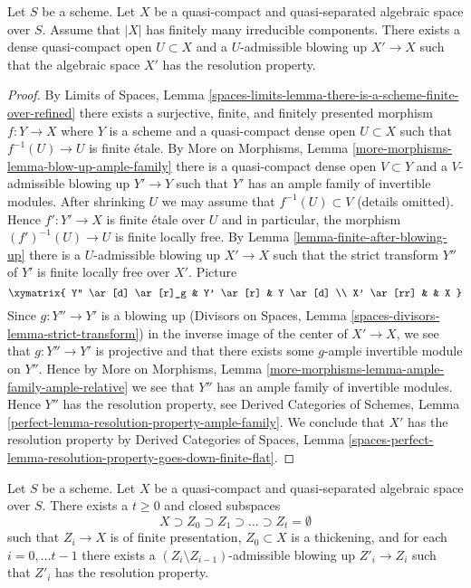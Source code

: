 \begin{lemma}
\label{lemma-blow-up-resolution-property}
Let $S$ be a scheme. Let $X$ be a quasi-compact and quasi-separated
algebraic space over $S$. Assume that $|X|$ has finitely many irreducible
components. There exists a dense quasi-compact open $U \subset X$
and a $U$-admissible blowing up $X' \to X$ such that the algebraic space
$X'$ has the resolution property.
\end{lemma}

\begin{proof}
By Limits of Spaces, Lemma
\ref{spaces-limits-lemma-there-is-a-scheme-finite-over-refined}
there exists a surjective, finite, and finitely presented morphism
$f : Y \to X$ where $Y$ is a scheme and a quasi-compact dense open
$U \subset X$ such that $f^{-1}(U) \to U$ is finite \'etale.
By More on Morphisms, Lemma \ref{more-morphisms-lemma-blow-up-ample-family}
there is a quasi-compact dense open $V \subset Y$ and a $V$-admissible
blowing up $Y' \to Y$ such that $Y'$ has an ample family of invertible
modules. After shrinking $U$ we may assume that $f^{-1}(U) \subset V$
(details omitted). Hence $f' : Y' \to X$ is finite \'etale over $U$
and in particular, the morphism $(f')^{-1}(U) \to U$ is finite locally free.
By Lemma \ref{lemma-finite-after-blowing-up} there is a $U$-admissible
blowing up $X' \to X$ such that the strict transform $Y''$ of $Y'$
is finite locally free over $X'$. Picture
$$
\xymatrix{
Y'' \ar[d] \ar[r]_g &
Y' \ar[r] &
Y \ar[d] \\
X' \ar[rr] & & X
}
$$
Since $g : Y'' \to Y'$ is a blowing up
(Divisors on Spaces, Lemma \ref{spaces-divisors-lemma-strict-transform})
in the inverse image of the center of $X' \to X$, we see that
$g : Y'' \to Y'$ is projective and that there exists some 
$g$-ample invertible module on $Y''$. Hence by
More on Morphisms, Lemma \ref{more-morphisms-lemma-ample-family-ample-relative}
we see that $Y''$ has an ample family of invertible modules.
Hence $Y''$ has the resolution property, see
Derived Categories of Schemes, Lemma
\ref{perfect-lemma-resolution-property-ample-family}.
We conclude that $X'$ has the resolution property
by
Derived Categories of Spaces, Lemma
\ref{spaces-perfect-lemma-resolution-property-goes-down-finite-flat}.
\end{proof}

\begin{lemma}
\label{lemma-blow-up-resolution-property-filtered}
Let $S$ be a scheme. Let $X$ be a quasi-compact and quasi-separated
algebraic space over $S$. There exists a $t \geq 0$ and closed
subspaces
$$
X \supset Z_0 \supset Z_1 \supset \ldots \supset Z_t = \emptyset
$$
such that $Z_i \to X$ is of finite presentation,
$Z_0 \subset X$ is a thickening, and for each $i = 0, \ldots t - 1$
there exists a $(Z_i \setminus Z_{i - 1})$-admissible
blowing up $Z'_i \to Z_i$ such that $Z'_i$ has the resolution property.
\end{lemma}

